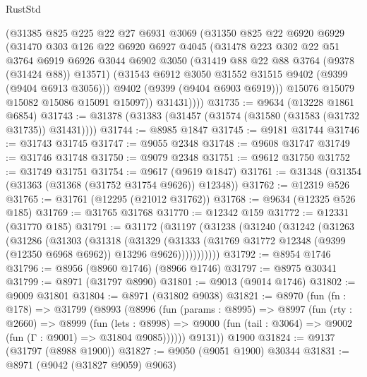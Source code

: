 \begin{lexlean}{RustStd}
\begin{coremodule}
          (@31385
            @825
            @225
            @22
            @27
            @6931
            @3069
            (@31350
              @825
              @22
              @6920
              @6929
              (@31470
                @303
                @126
                @22
                @6920
                @6927
                @4045
                (@31478
                  @223
                  @302
                  @22
                  @51
                  @3764
                  @6919
                  @6926
                  @3044
                  @6902
                  @3050
                  (@31419 @88 @22 @88 @3764 (@9378 (@31424 @88)) @13571)
                  (@31543 @6912 @3050 @31552 @31515 @9402 (@9399 (@9404 @6913 @3056)))
                  @9402
                  (@9399 (@9404 @6903 @6919)))
                @15076
                @15079
                @15082
                @15086
                @15091
                @15097))
            @31431))))
@31735 := @9634 (@13228 @1861 @6854)
@31743 := @31378 (@31383 (@31457 (@31574 (@31580 (@31583 (@31732 @31735)) @31431))))
@31744 := @8985 @1847
@31745 := @9181 @31744
@31746 := @31743 @31745
@31747 := @9055 @2348
@31748 := @9608 @31747
@31749 := @31746 @31748
@31750 := @9079 @2348
@31751 := @9612 @31750
@31752 := @31749 @31751
@31754 := @9617 (@9619 @1847)
@31761 := @31348 (@31354 (@31363 (@31368 (@31752 @31754 @9626)) @12348))
@31762 := @12319 @526
@31765 := @31761 (@12295 (@21012 @31762))
@31768 := @9634 (@12325 @526 @185)
@31769 := @31765 @31768
@31770 := @12342 @159
@31772 := @12331 (@31770 @185)
@31791 := @31172
    (@31197
      (@31238
        (@31240
          (@31242
            (@31263
              (@31286
                (@31303
                  (@31318
                    (@31329
                      (@31333
                        (@31769 @31772 @12348 (@9399 (@12350 @6968 @6962)) @13296 @9626)))))))))))
@31792 := @8954 @1746
@31796 := @8956 (@8960 @1746) (@8966 @1746)
@31797 := @8975 @30341
@31799 := @8971 (@31797 @8990)
@31801 := @9013 (@9014 @1746)
@31802 := @9009 @31801
@31804 := @8971 (@31802 @9038)
@31821 := @8970
    (fun (fn : @178) =>
    @31799
      (@8993
        (@8996
          (fun (params : @8995) =>
          @8997
            (fun (rty : @2660) =>
            @8999
              (fun (lets : @8998) =>
              @9000 (fun (tail : @3064) => @9002 (fun (Γ : @9001) => @31804 @9085))))))
        @9131))
    @1900
@31824 := @9137 (@31797 (@8988 @1900))
@31827 := @9050 (@9051 @1900) @30344
@31831 := @8971 (@9042 (@31827 @9059) @9063)

\end{coremodule}
\end{lexlean}
